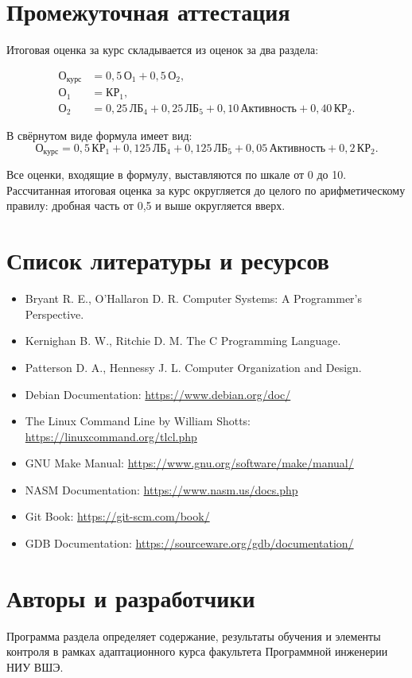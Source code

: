 \documentclass[a4paper,14pt]{extreport}
\begin{document}
\chapter{Промежуточная аттестация}

Итоговая оценка за курс складывается из оценок за два раздела:

\begin{align*}
    \text{О}_{\text{курс}} &= 0{,}5\,\text{О}_1 + 0{,}5\,\text{О}_2,\\
    \text{О}_1 &= \text{КР}_1,\\
    \text{О}_2 &= 0{,}25\,\text{ЛБ}_4 + 0{,}25\,\text{ЛБ}_5
        + 0{,}10\,\text{Активность} + 0{,}40\,\text{КР}_2.
\end{align*}

В свёрнутом виде формула имеет вид:
\[
\text{О}_{\text{курс}} = 0{,}5\,\text{КР}_1 + 0{,}125\,\text{ЛБ}_4
    + 0{,}125\,\text{ЛБ}_5 + 0{,}05\,\text{Активность}
    + 0{,}2\,\text{КР}_2.
\]

Все оценки, входящие в формулу, выставляются по шкале от 0 до 10. Рассчитанная
итоговая оценка за курс округляется до целого по арифметическому правилу:
дробная часть от 0{,}5 и выше округляется вверх.

\chapter{Список литературы и ресурсов}

\begin{itemize}
    \item Bryant R. E., O'Hallaron D. R. Computer Systems: A Programmer's Perspective.
    \item Kernighan B. W., Ritchie D. M. The C Programming Language.
    \item Patterson D. A., Hennessy J. L. Computer Organization and Design.
    \item Debian Documentation: \url{https://www.debian.org/doc/}
    \item The Linux Command Line by William Shotts: \url{https://linuxcommand.org/tlcl.php}
    \item GNU Make Manual: \url{https://www.gnu.org/software/make/manual/}
    \item NASM Documentation: \url{https://www.nasm.us/docs.php}
    \item Git Book: \url{https://git-scm.com/book/}
    \item GDB Documentation: \url{https://sourceware.org/gdb/documentation/}
\end{itemize}

\chapter{Авторы и разработчики}

Программа раздела определяет содержание, результаты обучения и элементы контроля в рамках адаптационного курса факультета Программной инженерии НИУ ВШЭ.
\end{document}
